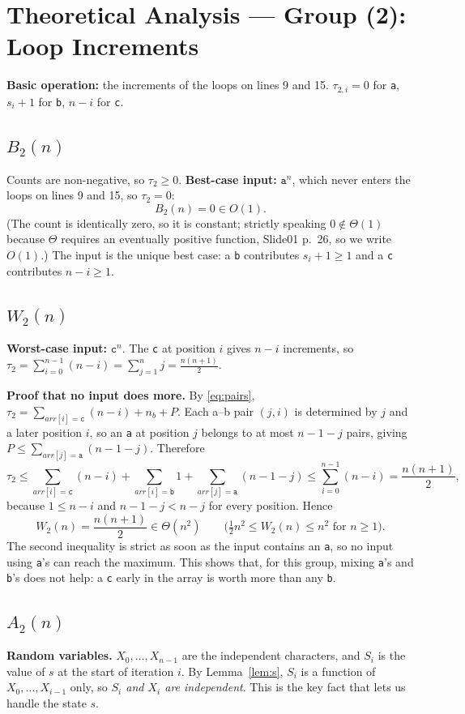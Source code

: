 \documentclass[11pt]{article}
\theoremstyle{remark}
\newcommand{\ta}{\texttt{a}}
\newcommand{\tb}{\texttt{b}}
\newcommand{\tc}{\texttt{c}}
\begin{document}
\section{Theoretical Analysis --- Group (2): Loop Increments}
\textbf{Basic operation:} the increments of the loops on lines 9 and 15.
$\tau_{2,i}=0$ for \ta, $s_i+1$ for \tb, $n-i$ for \tc.

\subsection{$B_2(n)$}
Counts are non-negative, so $\tau_2\ge 0$. \textbf{Best-case input:} $\ta^n$, which never enters the loops on lines 9
and 15, so $\tau_2=0$:
\[
B_2(n)=0\in O(1).
\]
(The count is identically zero, so it is constant; strictly speaking $0\notin\Theta(1)$ because $\Theta$ requires an
eventually positive function, Slide01 p.~26, so we write $O(1)$.) The input is the unique best case: a \tb{}
contributes $s_i+1\ge1$ and a \tc{} contributes $n-i\ge 1$.

\subsection{$W_2(n)$}
\textbf{Worst-case input:} $\tc^n$. The \tc{} at position $i$ gives $n-i$ increments, so
$\tau_2=\sum_{i=0}^{n-1}(n-i)=\sum_{j=1}^n j=\frac{n(n+1)}{2}$.

\textbf{Proof that no input does more.} By \eqref{eq:pairs},
$\tau_2 = \sum_{arr[i]=\tc}(n-i)+n_b+P$. Each a--b pair $(j,i)$ is determined by $j$ and a later position $i$, so an
\ta{} at position $j$ belongs to at most $n-1-j$ pairs, giving $P\le\sum_{arr[j]=\ta}(n-1-j)$. Therefore
\[
\tau_2\le \sum_{arr[i]=\tc}(n-i)+\sum_{arr[i]=\tb}1+\sum_{arr[j]=\ta}(n-1-j)
\le \sum_{i=0}^{n-1}(n-i)=\frac{n(n+1)}{2},
\]
because $1\le n-i$ and $n-1-j< n-j$ for every position. Hence
\[
W_2(n)=\frac{n(n+1)}{2}\in\Theta(n^2)\qquad\Big(\tfrac12 n^2\le W_2(n)\le n^2\text{ for }n\ge1\Big).
\]
The second inequality is strict as soon as the input contains an \ta, so no input using \ta's can reach the maximum.
This shows that, for this group, mixing \ta's and \tb's does not help: a \tc{} early in the array is worth more than
any \tb.

\subsection{$A_2(n)$}
\label{sec:Es}
\textbf{Random variables.} $X_0,\dots,X_{n-1}$ are the independent characters, and $S_i$ is the value of $s$ at the
start of iteration $i$. By Lemma~\ref{lem:s}, $S_i$ is a function of $X_0,\dots,X_{i-1}$ only, so \emph{$S_i$ and
$X_i$ are independent}. This is the key fact that lets us handle the state $s$.
\end{document}
